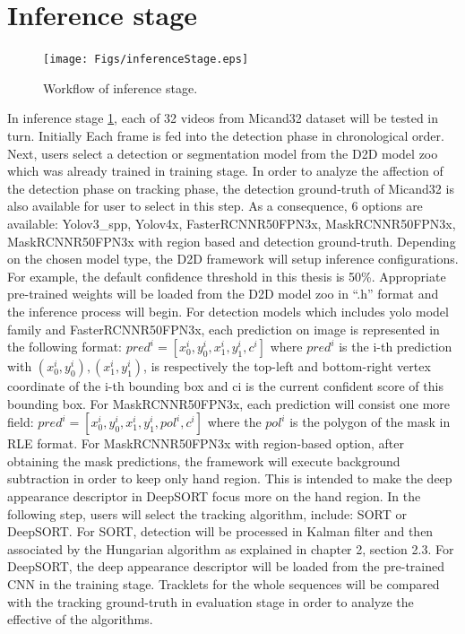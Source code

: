 \section{Inference stage}\label{sec:inferstage}
\begin{figure}[htbp]
	\centerline{\texttt{[image: Figs/inferenceStage.eps]}}
	\caption{Workflow of inference stage.}
	\label{fig:inferenceStage}
\end{figure}
In inference stage \ref{fig:inferenceStage}, each of 32 videos from Micand32 dataset will be tested in turn. Initially Each frame is fed into the detection phase in chronological order. Next, users select a detection or segmentation model from the D2D model zoo which was already trained in training stage. In order to analyze the affection of the detection phase on tracking phase, the detection ground-truth of Micand32 is also available for user to select in this step. As a consequence, 6 options are available: Yolov3\_spp, Yolov4x, FasterRCNNR50FPN3x, MaskRCNNR50FPN3x, MaskRCNNR50FPN3x with region based and detection ground-truth. Depending on the chosen model type, the D2D framework will setup inference configurations. For example, the default confidence threshold in this thesis is 50\%. Appropriate pre-trained weights will be loaded from the D2D model zoo in “.h” format and the inference process will begin. For detection models which includes yolo model family and FasterRCNNR50FPN3x, each prediction on image is represented in the following format: \(pred^i = [x_0^i, y_0^i, x_1^i, y_1^i, c^i]\) where \(pred^i\) is the i-th prediction with \((x_0^i, y_0^i),  (x_1^i, y_1^i)\), is respectively the top-left and bottom-right vertex coordinate of the i-th bounding box and ci is the current confident score of this bounding box. For MaskRCNNR50FPN3x, each prediction will consist one more field: \(pred^i = [x_0^i, y_0^i, x_1^i, y_1^i, pol^i, c^i]\) where the \(pol^i\) is the polygon of the mask in RLE format. For MaskRCNNR50FPN3x with region-based option, after obtaining the mask predictions, the framework will execute background subtraction in order to keep only hand region. This is intended to make the deep appearance descriptor in DeepSORT focus more on the hand region. In the following step, users will select the tracking algorithm, include: SORT or DeepSORT. For SORT, detection will be processed in Kalman filter and then associated by the Hungarian algorithm as explained in chapter 2, section 2.3. For DeepSORT, the deep appearance descriptor will be loaded from the pre-trained CNN in the training stage. Tracklets for the whole sequences will be compared with the tracking ground-truth in evaluation stage in order to analyze the effective of the algorithms.
